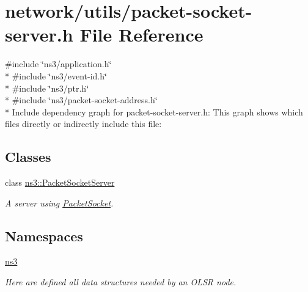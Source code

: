 \hypertarget{packet-socket-server_8h}{}\section{network/utils/packet-\/socket-\/server.h File Reference}
\label{packet-socket-server_8h}
{\ttfamily \#include \char`\"{}ns3/application.\+h\char`\"{}}\\*
{\ttfamily \#include \char`\"{}ns3/event-\/id.\+h\char`\"{}}\\*
{\ttfamily \#include \char`\"{}ns3/ptr.\+h\char`\"{}}\\*
{\ttfamily \#include \char`\"{}ns3/packet-\/socket-\/address.\+h\char`\"{}}\\*
Include dependency graph for packet-\/socket-\/server.h\+:
This graph shows which files directly or indirectly include this file\+:
\subsection*{Classes}
\begin{DoxyCompactItemize}
\item 
class \hyperlink{classns3_1_1PacketSocketServer}{ns3\+::\+Packet\+Socket\+Server}
\begin{DoxyCompactList}\small\item\em A server using \hyperlink{classns3_1_1PacketSocket}{Packet\+Socket}. \end{DoxyCompactList}\end{DoxyCompactItemize}
\subsection*{Namespaces}
\begin{DoxyCompactItemize}
\item 
 \hyperlink{namespacens3}{ns3}
\begin{DoxyCompactList}\small\item\em Here are defined all data structures needed by an O\+L\+SR node. \end{DoxyCompactList}\end{DoxyCompactItemize}
